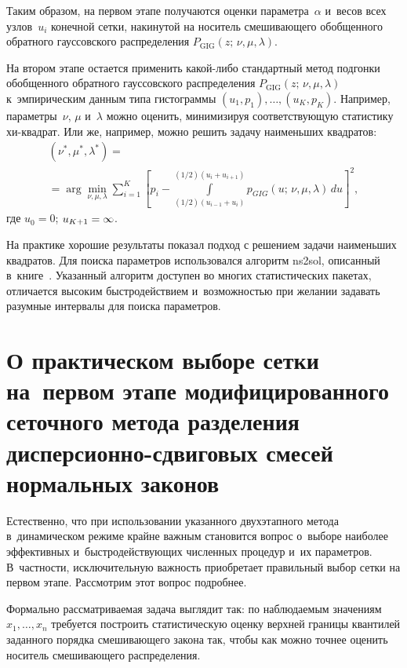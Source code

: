 \begin{multicols}{2}
\smallskip

Таким образом, на первом этапе получаются оценки параметра~$\alpha$
и~весов всех узлов~$u_i$ конечной сетки, накинутой на носитель
смешивающего обобщенного обратного гауссовского распределения
$P_{\mathrm{GIG}}(z;\,\nu,\mu,\lambda)$.

На втором этапе остается применить ка\-кой-ли\-бо стандартный метод
подгонки обобщенного обратного гауссовского распределения
$P_{\mathrm{GIG}}(z;\,\nu,\mu,\lambda)$ к~эмпирическим данным типа
гистограммы $(u_1, p_1),\ldots, (u_K, p_K)$. Например, параметры~$\nu$,
$\mu$ и~$\lambda$ можно оценить, минимизируя соответствующую
статистику хи-квад\-рат. Или же, например, можно решить задачу
наименьших квад\-ратов:
\begin{multline*}
(\nu^*,\mu^*,\lambda^*)={}\\
{}=\arg\min\limits_{\nu,\mu,\lambda}\sum\limits_{i=1}^K
\left[p_i- \!\!\!\!\!
\int\limits_{(1/2)\left(u_{i-1}+u_i\right)}^{(1/2)(u_i+u_{i+1})}\!\!\!\!\!\!\!\!\!\!\!\!\!\!\!
p_{GIG}(u;\,\nu,\mu,\lambda)\,du\right]^2,
\end{multline*}
где $u_0=0$; $u_{K+1}\hm=\infty$.

На практике хорошие результаты показал подход с решением задачи
наименьших квадратов. Для поиска параметров использовался алгоритм
ns2sol, описанный в~книге~\cite{DSch1983}. Указанный алгоритм
доступен во многих статистических пакетах, отличается высоким
быстродействием и~возможностью при желании задавать разумные
интервалы для поиска параметров.


\section{О практическом выборе сетки
на~первом этапе моди\-фи\-ци\-ро\-ван\-но\-го
сеточного метода разделения дисперсионно-сдвиговых смесей нормальных
законов}

Естественно, что при использовании указанного двухэтапного метода
в~динамическом режиме крайне важным становится вопрос о~выборе
наиболее эффективных и~быстродействующих численных процедур и~их
параметров. В~частности, исключительную важность приобретает
правильный выбор сетки на первом этапе. Рассмотрим этот вопрос
подробнее.

Формально рассматриваемая задача выглядит так: по наблюдаемым
значениям $x_1,\ldots,x_n$ требуется построить статистическую оценку
верхней границы квантилей заданного порядка сме\-ши\-ва\-юще\-го закона так,
чтобы как можно точнее оценить носитель смешивающего распределения.


\end{multicols}
